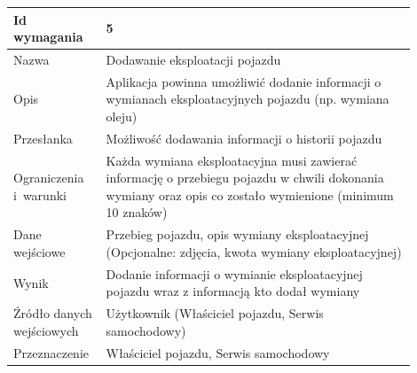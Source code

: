 \documentclass[12pt]{article}
\begin{document}
\begin{table}[H]
\begin{center}
	\begin{tabular}{|p{0.18\linewidth}|p{0.72\linewidth}|}%
	\hline
	Id wymagania 	& 5 				\\ \hline
	Nazwa			& Dodawanie eksploatacji pojazdu \\ \hline
	Opis &	 Aplikacja powinna umożliwić dodanie informacji o wymianach eksploatacyjnych pojazdu (np. wymiana oleju)\\ \hline
	Przesłanka & Możliwość dodawania informacji o historii pojazdu  \\ \hline
	Ograniczenia i~warunki & Każda wymiana eksploatacyjna musi zawierać informację o przebiegu pojazdu w chwili dokonania wymiany oraz opis co zostało wymienione (minimum 10 znaków) \\ \hline
	Dane wejściowe &Przebieg pojazdu, opis wymiany eksploatacyjnej
(Opcjonalne: zdjęcia, kwota wymiany eksploatacyjnej) \\ \hline
	Wynik & Dodanie informacji o wymianie eksploatacyjnej pojazdu wraz z informacją kto dodał wymiany\\ \hline
	Źródło danych wejściowych &Użytkownik (Właściciel pojazdu, Serwis samochodowy)\\ \hline	Przeznaczenie & Właściciel pojazdu, Serwis samochodowy\\ \hline
	\end{tabular}
\end{center}
\end{table}
\end{document}
